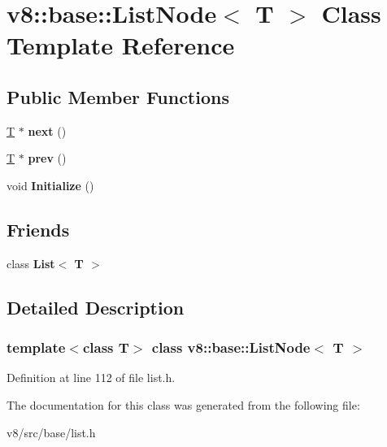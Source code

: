 \hypertarget{classv8_1_1base_1_1ListNode}{}\section{v8\+:\+:base\+:\+:List\+Node$<$ T $>$ Class Template Reference}
\label{classv8_1_1base_1_1ListNode}
\subsection*{Public Member Functions}
\begin{DoxyCompactItemize}
\item 
\mbox{\label{classv8_1_1base_1_1ListNode_ab1e8dc50f5378820552513d84fdf2245}} 
\mbox{\hyperlink{classv8_1_1internal_1_1torque_1_1T}{T}} $\ast$ {\bfseries next} ()
\item 
\mbox{\label{classv8_1_1base_1_1ListNode_a3ffced1d43cbc98cfe531bf41585b830}} 
\mbox{\hyperlink{classv8_1_1internal_1_1torque_1_1T}{T}} $\ast$ {\bfseries prev} ()
\item 
\mbox{\label{classv8_1_1base_1_1ListNode_a9a5aa6347aa72c7ae2af4f2bdeebba43}} 
void {\bfseries Initialize} ()
\end{DoxyCompactItemize}
\subsection*{Friends}
\begin{DoxyCompactItemize}
\item 
\mbox{\label{classv8_1_1base_1_1ListNode_adfa51a0eca1eba953f68ca3f65cdaa05}} 
class {\bfseries List$<$ T $>$}
\end{DoxyCompactItemize}


\subsection{Detailed Description}
\subsubsection*{template$<$class T$>$\newline
class v8\+::base\+::\+List\+Node$<$ T $>$}



Definition at line 112 of file list.\+h.



The documentation for this class was generated from the following file\+:\begin{DoxyCompactItemize}
\item 
v8/src/base/list.\+h\end{DoxyCompactItemize}
